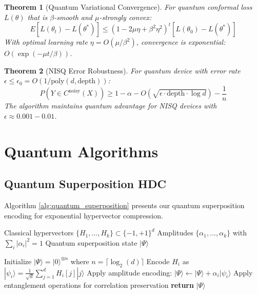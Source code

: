 \documentclass[10pt,twocolumn,letterpaper]{article}
\newtheorem{theorem}{Theorem}
\begin{document}
\begin{theorem}[Quantum Variational Convergence]
\label{thm:variational_convergence}
For quantum conformal loss $L(\theta)$ that is $\beta$-smooth and $\mu$-strongly convex:
$$E[L(\theta_t) - L(\theta^*)] \leq (1 - 2\mu\eta + \beta^2\eta^2)^t [L(\theta_0) - L(\theta^*)]$$
With optimal learning rate $\eta = O(\mu/\beta^2)$, convergence is exponential: $O(\exp(-\mu t/\beta))$.
\end{theorem}

\begin{theorem}[NISQ Error Robustness]
\label{thm:nisq_robustness}
For quantum device with error rate $\epsilon \leq \epsilon_0 = O(1/\text{poly}(d, \text{depth}))$:
$$P(Y \in C^{\text{noisy}}(X)) \geq 1 - \alpha - O\left(\sqrt{\epsilon \cdot \text{depth} \cdot \log d}\right) - \frac{1}{n}$$
The algorithm maintains quantum advantage for NISQ devices with $\epsilon \approx 0.001-0.01$.
\end{theorem}

\section{Quantum Algorithms}

\subsection{Quantum Superposition HDC}

Algorithm \ref{alg:quantum_superposition} presents our quantum superposition encoding for exponential hypervector compression.

\begin{algorithm}
\caption{Quantum Superposition HDC Encoding}
\label{alg:quantum_superposition}
\begin{algorithmic}[1]
\REQUIRE Classical hypervectors $\{H_1, \ldots, H_k\} \subset \{-1, +1\}^d$
\REQUIRE Amplitudes $\{\alpha_1, \ldots, \alpha_k\}$ with $\sum_i |\alpha_i|^2 = 1$
\ENSURE Quantum superposition state $|\Psi\rangle$

\STATE Initialize $|\Psi\rangle = |0\rangle^{\otimes n}$ where $n = \lceil \log_2(d) \rceil$
    \STATE Encode $H_i$ as $|\psi_i\rangle = \frac{1}{\sqrt{d}} \sum_{j=1}^d H_i[j] |j\rangle$
    \STATE Apply amplitude encoding: $|\Psi\rangle \leftarrow |\Psi\rangle + \alpha_i |\psi_i\rangle$
\ENDFOR
\STATE Apply entanglement operations for correlation preservation
\STATE \textbf{return} $|\Psi\rangle$
\end{algorithmic}
\end{algorithm}
\end{document}
